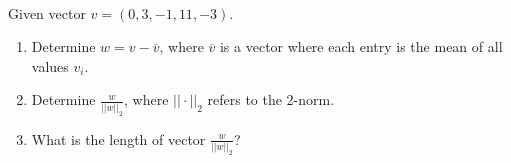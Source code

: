 \documentclass[10pt]{article}
\begin{document}
\\
 Given vector $v=(0,3,-1,11,-3)$.
\begin{enumerate}
\item Determine $w=v-\overline{v}$, where $\overline{v}$ is a
  vector where each entry is the mean of all values $v_i$.
\item Determine $\frac{w}{||w||_2}$, where $||\cdot||_2$ refers to the 2-norm.
\item What is the length of vector $\frac{w}{||w||_2}$?
\end{enumerate}
\end{document}

